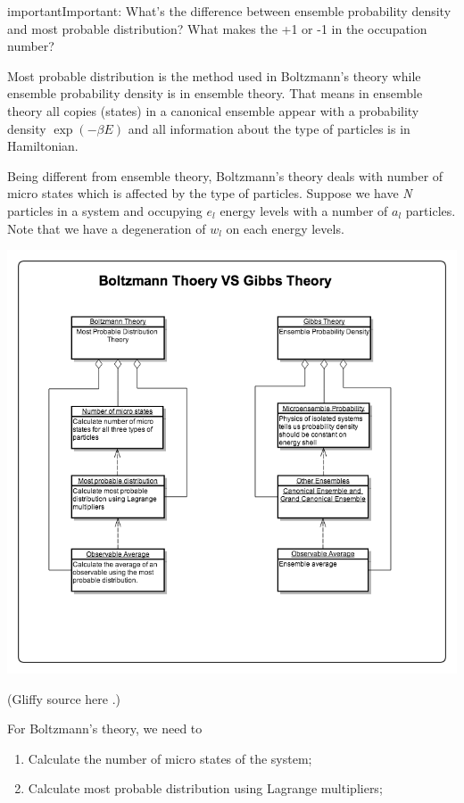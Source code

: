 \documentclass[letterpaper,10pt,english]{sphinxmanual}
\begin{document}
\begin{notice}{important}{Important:}
What's the difference between ensemble probability density and most probable distribution? What makes the +1 or -1 in the occupation number?

Most probable distribution is the method used in Boltzmann's theory while ensemble probability density is in ensemble theory. That means in ensemble theory all copies (states) in a canonical ensemble appear with a probability density $\exp(-\beta E)$ and all information about the type of particles is in Hamiltonian.

Being different from ensemble theory, Boltzmann's theory deals with number of micro states which is affected by the type of particles. Suppose we have \emph{N} particles in a system and occupying $e_l$ energy levels with a number of $a_l$ particles. Note that we have a degeneration of $w_l$ on each energy levels.

{\hfill\includegraphics{BoltzmannVSGibbs.png}\hfill}

(Gliffy source here .)

For Boltzmann's theory, we need to
\begin{enumerate}
\item {} 
Calculate the number of micro states of the system;

\item {} 
Calculate most probable distribution using Lagrange multipliers;


\end{enumerate}
\end{notice}
\end{document}

